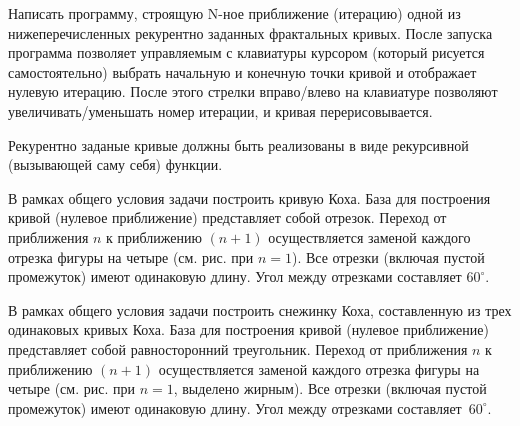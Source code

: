 

Написать программу, строящую N-ное приближение (итерацию) одной из 
нижеперечисленных рекурентно заданных фрактальных кривых. После запуска 
программа позволяет управляемым с клавиатуры курсором (который рисуется 
самостоятельно) выбрать начальную и конечную точки кривой и отображает нулевую 
итерацию. После этого стрелки вправо/влево на клавиатуре позволяют 
увеличивать/уменьшать номер итерации, и кривая перерисовывается.

Рекурентно заданые кривые должны быть реализованы в виде рекурсивной (вызывающей 
саму себя) функции.


\begin{zztask}
В рамках общего условия задачи построить кривую Коха. База для построения кривой
(нулевое приближение) представляет собой отрезок. Переход от приближения
$n$ к приближению $(n+1)$ осуществляется заменой каждого отрезка фигуры на четыре
(см. рис. при $n=1$). Все отрезки (включая пустой промежуток) имеют одинаковую 
длину. Угол между отрезками составляет $60^\circ$.
\par
\end{zztask}


\begin{zztask}
В рамках общего условия задачи построить снежинку Коха, составленную из
трех одинаковых кривых Коха. База для построения кривой (нулевое приближение) 
представляет собой равносторонний треугольник. Переход от приближения
$n$ к приближению $(n+1)$ осуществляется заменой каждого отрезка фигуры на четыре
(см. рис. при $n=1$, выделено жирным). Все отрезки (включая пустой промежуток)
имеют одинаковую длину. Угол между отрезками \mbox{составляет $60^\circ$}.
\par
\end{zztask}

